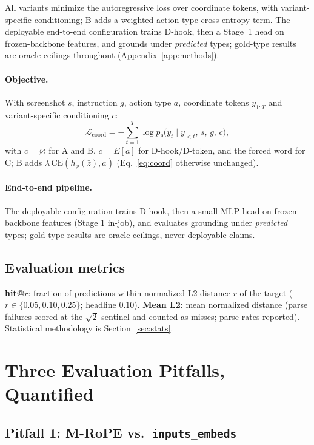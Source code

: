 \newcommand{\methobjective}{%
\paragraph{Objective.} With screenshot $s$, instruction $g$, action type
$a$, coordinate tokens $y_{1:T}$ and variant-specific conditioning $c$:
\begin{equation}
\mathcal{L}_{\mathrm{coord}} = -\sum_{t=1}^{T} \log
p_\theta\!\big(y_t \mid y_{<t},\, s,\, g,\, c\big),
\label{eq:coord}
\end{equation}
with $c=\varnothing$ for A and B, $c=E[a]$ for D-hook/D-token, and the
forced word for C; B adds $\lambda\,\mathrm{CE}(h_\phi(\bar z), a)$
(Eq.~\ref{eq:coord} otherwise unchanged).

\paragraph{End-to-end pipeline.} The deployable configuration trains
D-hook, then a small MLP head on frozen-backbone features (Stage 1
in-job), and evaluates grounding under \emph{predicted} types; gold-type
results are oracle ceilings, never deployable claims.

}
\ifworkshopbuild All variants minimize the autoregressive loss over coordinate tokens,
with variant-specific conditioning; B adds a weighted action-type
cross-entropy term. The deployable end-to-end configuration trains
D-hook, then a Stage~1 head on frozen-backbone features, and grounds
under \emph{predicted} types; gold-type results are oracle ceilings
throughout (Appendix~\ref{app:methods}).
\else\methobjective\fi

\subsection{Evaluation metrics}

\textbf{hit@$r$}: fraction of predictions within normalized L2 distance
$r$ of the target ($r\in\{0.05,0.10,0.25\}$; headline $0.10$).
\textbf{Mean L2}: mean normalized distance (parse failures scored at the
$\sqrt{2}$ sentinel and counted as misses; parse rates reported).
Statistical methodology is Section~\ref{sec:stats}.

\section{Three Evaluation Pitfalls, Quantified}
\label{sec:pitfalls}

\subsection{Pitfall 1: M-RoPE vs.\ \texttt{inputs\_embeds}}
\label{sec:mrope}

